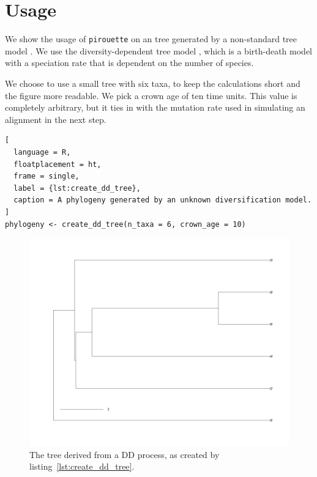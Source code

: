 \section{Usage}

We show the usage of \verb;pirouette; on an tree generated by a non-standard 
tree model . 
We use the diversity-dependent tree model \cite{DDD, etienne2011diversity},
which is a birth-death model with a speciation rate that is dependent on the
number of species. 

We choose to use a small tree with six taxa, to keep
the calculations short and the figure more readable.
We pick a crown age of ten time units. This value is 
completely arbitrary, but it ties in with the mutation rate 
used in simulating an alignment in the next step.

\begin{lstlisting}[
  language = R, 
  floatplacement = ht,
  frame = single, 
  label = {lst:create_dd_tree},
  caption = A phylogeny generated by an unknown diversification model.
]
phylogeny <- create_dd_tree(n_taxa = 6, crown_age = 10)
\end{lstlisting}
\begin{figure}[H]
  \includegraphics[width=\textwidth]{pirouette_example_30/example_30_314/true_tree.png}
  \caption{
    The tree derived from a DD process, 
    as created by listing~\ref{lst:create_dd_tree}.
  }
\end{figure}

